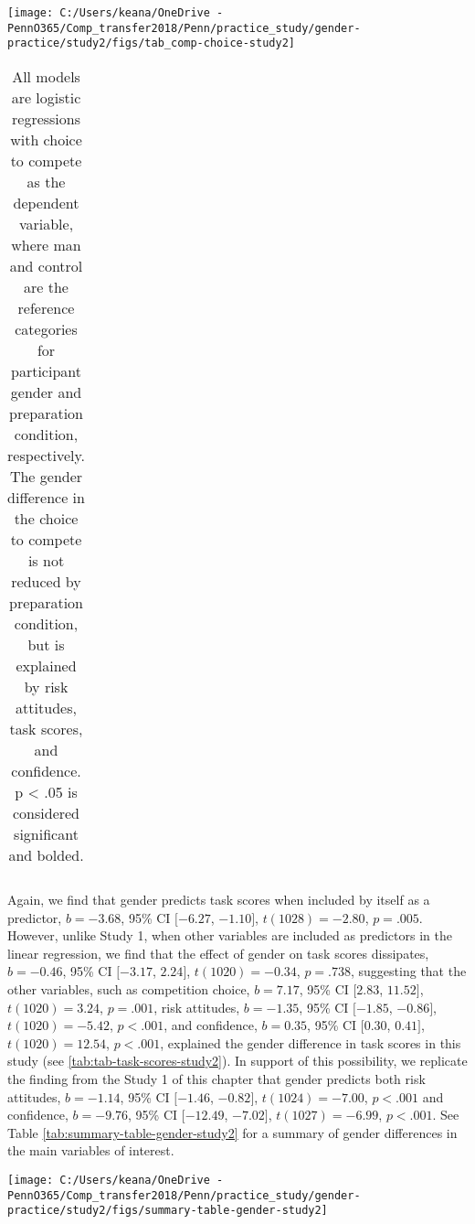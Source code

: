 \documentclass[letterpaper, nobind]{templates/ociamthesis}
\begin{document}
\begin{center}\texttt{[image: C:/Users/keana/OneDrive - PennO365/Comp\_transfer2018/Penn/practice\_study/gender-practice/study2/figs/tab\_comp-choice-study2]} \end{center}

\begin{table}[ht]
\centering
\begingroup\fontsize{0.1pt}{0.1pt}\selectfont
\begin{tabular}{r}
   \\ 
 \end{tabular}
\endgroup
\caption{All models are logistic regressions with choice to compete as the dependent variable, where man and control are the reference categories for participant gender and preparation condition, respectively. The gender difference in the choice to compete is not reduced by preparation condition, but is explained by risk attitudes, task scores, and confidence. p < .05 is considered significant and bolded.} 
\label{tab:tab-comp-choice-study2}
\end{table}

Again, we find that gender predicts task scores when included by itself as a predictor, \(b = -3.68\), 95\% CI \([-6.27\), \(-1.10]\), \(t(1028) = -2.80\), \(p = .005\). However, unlike Study 1, when other variables are included as predictors in the linear regression, we find that the effect of gender on task scores dissipates, \(b = -0.46\), 95\% CI \([-3.17\), \(2.24]\), \(t(1020) = -0.34\), \(p = .738\), suggesting that the other variables, such as competition choice, \(b = 7.17\), 95\% CI \([2.83\), \(11.52]\), \(t(1020) = 3.24\), \(p = .001\), risk attitudes, \(b = -1.35\), 95\% CI \([-1.85\), \(-0.86]\), \(t(1020) = -5.42\), \(p < .001\), and confidence, \(b = 0.35\), 95\% CI \([0.30\), \(0.41]\), \(t(1020) = 12.54\), \(p < .001\), explained the gender difference in task scores in this study (see \ref{tab:tab-task-scores-study2}). In support of this possibility, we replicate the finding from the Study 1 of this chapter that gender predicts both risk attitudes, \(b = -1.14\), 95\% CI \([-1.46\), \(-0.82]\), \(t(1024) = -7.00\), \(p < .001\) and confidence, \(b = -9.76\), 95\% CI \([-12.49\), \(-7.02]\), \(t(1027) = -6.99\), \(p < .001\). See Table \ref{tab:summary-table-gender-study2} for a summary of gender differences in the main variables of interest.

\begin{center}\texttt{[image: C:/Users/keana/OneDrive - PennO365/Comp\_transfer2018/Penn/practice\_study/gender-practice/study2/figs/summary-table-gender-study2]} \end{center}
\end{document}
